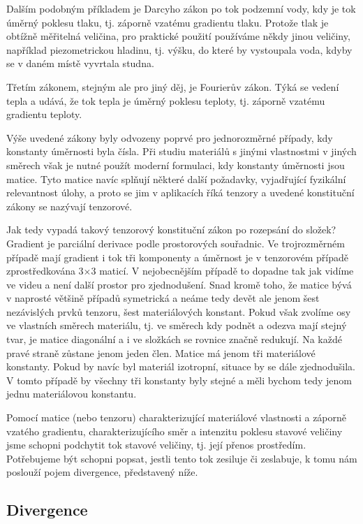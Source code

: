 \documentclass[12pt]{article}
\begin{document}
Dalším podobným příkladem je Darcyho zákon po tok podzemní vody, kdy je tok úměrný poklesu tlaku, tj. záporně vzatému gradientu tlaku. Protože tlak je obtížně měřitelná veličina, pro praktické použití používáme někdy jinou veličiny, například piezometrickou hladinu, tj. výšku, do které by vystoupala voda, kdyby se v daném místě vyvrtala studna.

Třetím zákonem, stejným ale pro jiný děj, je Fourierův zákon. Týká se vedení tepla a udává, že tok tepla je úměrný poklesu teploty, tj. záporně vzatému gradientu teploty.

Výše uvedené zákony byly odvozeny poprvé pro jednorozměrné případy, kdy konstanty úměrnosti byla čísla. Při studiu materiálů s jinými vlastnostmi v jiných směrech však je nutné použít moderní formulaci, kdy konstanty úměrnosti jsou matice. Tyto matice navíc splňují některé další požadavky, vyjadřující fyzikální relevantnost úlohy, a proto se jim v aplikacích říká tenzory a uvedené konstituční zákony se nazývají tenzorové.

Jak tedy vypadá takový tenzorový konstituční zákon po rozepsání do složek? Gradient je parciální derivace podle prostorových souřadnic. Ve trojrozměrném případě mají gradient i tok tři komponenty a úměrnost je v tenzorovém případě zprostředkována 3$\times$3 maticí. V nejobecnějším případě to dopadne tak jak vidíme ve videu a není další prostor pro zjednodušení. Snad kromě toho, že matice bývá v naprosté většině případů symetrická a neáme tedy devět ale jenom šest nezávislých prvků tenzoru, šest materiálových konstant. Pokud však zvolíme osy ve vlastních směrech materiálu, tj. ve směrech kdy podnět a odezva mají stejný tvar, je matice diagonální a i ve složkách se rovnice značně redukují. Na každé pravé straně zůstane jenom jeden člen. Matice má jenom tři materiálové konstanty. Pokud by navíc byl materiál izotropní, situace by se dále zjednodušila. V tomto případě by všechny tři konstanty byly stejné a měli bychom tedy jenom jednu materiálovou konstantu.

Pomocí matice (nebo tenzoru) charakterizující materiálové vlastnosti a záporně vzatého gradientu, charakterizujícího směr a intenzitu poklesu stavové veličiny jsme schopni podchytit tok stavové veličiny, tj. její přenos prostředím. Potřebujeme být schopni popsat, jestli tento tok zesiluje či zeslabuje, k tomu nám poslouží pojem divergence, představený níže. 

\subsection{Divergence}
\end{document}
